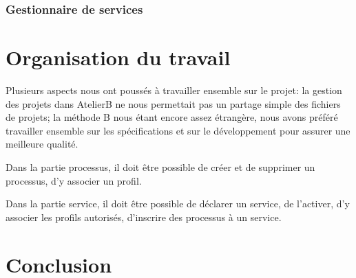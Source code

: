 \documentclass[french, titlepage, 11pt, a4paper]{article}
\begin{document}
\subsubsection{Gestionnaire de services}

\section{Organisation du travail}
Plusieurs aspects nous ont poussés à travailler ensemble sur le projet: la
gestion des projets dans AtelierB ne nous permettait pas un partage simple des
fichiers de projets; la méthode B nous étant encore assez étrangère, nous avons
préféré travailler ensemble sur les spécifications et sur le développement pour
assurer une meilleure qualité.

Dans la partie processus, il doit être possible de créer et de supprimer un
processus, d'y associer un profil.

Dans la partie service, il doit être possible de déclarer un service, de
l'activer, d'y associer les profils autorisés, d'inscrire des processus à un
service.

\section{Conclusion}
\end{document}
